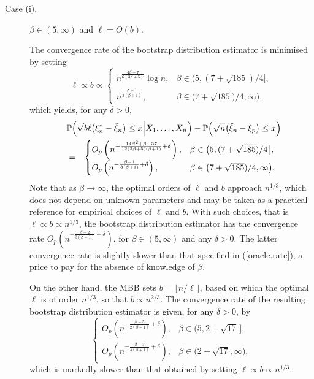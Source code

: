 \documentclass[a4paper, 12pt]{article}
\theoremstyle{plain}
\theoremstyle{definition}
\newcommand{\prob}{{\Bbb P}}
\begin{document}
\begin{description}
\item[Case (i).]  $\beta\in(5,\infty)$ and $\ell=O(b)$.

The convergence rate of the bootstrap distribution estimator is minimised
by setting
\[\ell\propto b\propto
\begin{cases}
n^{\frac{4\beta+7}{6(3\beta+5)}}\log n,&\beta\in\big(5,(7+\sqrt{185})/4\big],\\
n^{\frac{\beta-1}{3(\beta+1)}},&\beta\in\big(7+\sqrt{185})/4,\infty\big),
\end{cases}
\]
which yields, for any $\delta>0$,
\begin{eqnarray}
\lefteqn{
\prob\Big(\sqrt{b\ell}\big(\xi^*_n-\tilde\xi_n\big)\le x
\Big|X_1,\ldots,X_n\Big)-
\prob\Big(\sqrt{n}\big(\hat\xi_n-\xi_p\big)\le x\Big)}\nonumber\\
&=&
\begin{cases}
O_p\left(n^{-\frac{14\beta^2+\beta-37}{12(3\beta+5)(\beta+1)}+\delta}\right),
&\beta\in\big(5,(7+\sqrt{185})/4\big],\\
O_p\left(n^{-\frac{\beta-1}{3(\beta+1)}+\delta}\right),
&\beta\in\big(7+\sqrt{185})/4,\infty\big).
\end{cases}
\label{oracle.rate}
\end{eqnarray}
Note that as $\beta\rightarrow\infty$, the optimal orders of $\ell$ and $b$ approach $n^{1/3}$, 
which does not depend on unknown parameters and
may be taken as a practical reference for empirical choices of $\ell$ and $b$.
With such choices, that is $\ell\propto b\propto n^{1/3}$, the bootstrap distribution estimator
has the convergence rate
$O_p\left(n^{-\frac{\beta-2}{3(\beta+1)}+\delta}\right)$, for $\beta\in(5,\infty)$
and any $\delta>0$. The latter convergence rate is slightly slower than that specified in (\ref{oracle.rate}), a price to pay for
the absence of knowledge of $\beta$.

On the other hand, the MBB sets $b=\lfloor n/\ell\rfloor$, based on which the optimal $\ell$ is of order $n^{1/3}$, so that $b\propto n^{2/3}$.
The convergence rate of the resulting bootstrap distribution estimator is given, for any $\delta>0$, by
\[
\begin{cases}
O_p\left(n^{-\frac{\beta-5}{2(\beta-1)}+\delta}\right),
&\beta\in\big(5,2+\sqrt{17}\,\big],\\
O_p\left(n^{-\frac{\beta-3}{4(\beta+1)}+\delta}\right),
&\beta\in\big(2+\sqrt{17},\infty\big),
\end{cases}
\]
which is markedly slower than that obtained by setting $\ell\propto b\propto n^{1/3}$.


\end{description}
\end{document}
